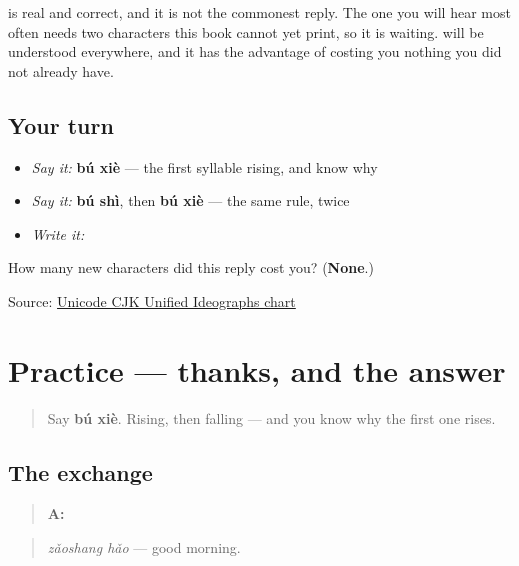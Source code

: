 \begin{culture}
 is real and correct, and it is not the commonest reply. The one you will hear most often needs two characters this book cannot yet print, so it is waiting.  will be understood everywhere, and it has the advantage of costing you nothing you did not already have.
\end{culture}

\subsection*{Your turn}
\begin{itemize}
\raggedright
  \item \emph{Say it:} \textbf{bú xiè} — the first syllable rising, and know why
  \item \emph{Say it:} \textbf{bú shì}, then \textbf{bú xiè} — the same rule, twice
  \item \emph{Write it:} 
\end{itemize}

\begin{tcolorbox}[breakable,colback=teal!4,colframe=teal!35!black,title={Before you move on}]
How many new characters did this reply cost you? (\textbf{None}.)

Source: \href{https://www.unicode.org/charts/PDF/U4E00.pdf}{Unicode CJK Unified Ideographs chart}
\end{tcolorbox}
\section[Practice]{Practice — thanks, and the answer}

\label{lesson:ZH-C10-practice}



\begin{quote}
Say \textbf{bú xiè}. Rising, then falling — and you know why the first one rises.
\end{quote}

\subsection*{The exchange}
\begin{quote}
\textbf{A:} 
\end{quote}

\begin{quote}
\emph{zǎoshang hǎo} — good morning.
\end{quote}


